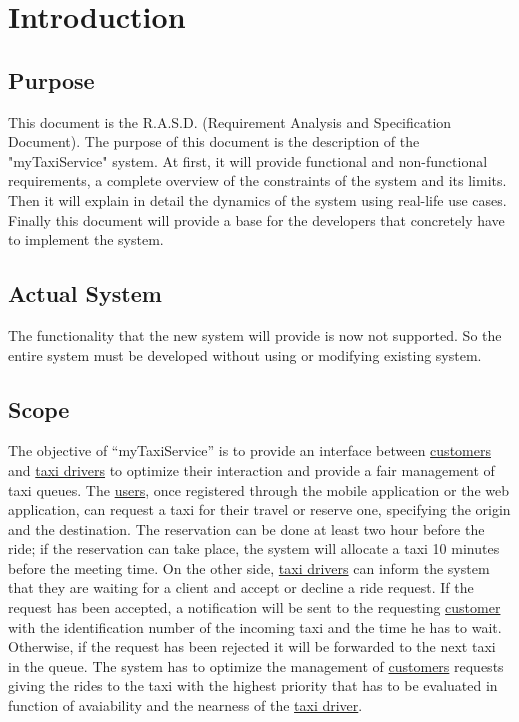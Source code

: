 \newpage
\chapter{Introduction}

	\section{Purpose}
	This document is the R.A.S.D. (Requirement Analysis and Specification Document).
	The purpose of this document is the description of the "myTaxiService" system. 
	At first, it will provide functional and non-functional requirements, a complete overview of the constraints of the system and its limits. Then it will explain in detail the dynamics of the system using real-life use cases.
	Finally this document will provide a base for the developers that concretely have to implement the system.

	\section{Actual System}
	The functionality that the new system will provide is now not supported. 
	So the entire system must be developed without using or modifying existing system.

	\section{Scope}
	The objective of “myTaxiService” is to provide an interface between \hyperref[sec:customer]{customers} and \hyperref[sec:tdriver]{taxi drivers} to optimize their interaction and provide a fair management of taxi queues. The \hyperref[sec:normaluser]{users}, once registered through the mobile application or the web application, can request a taxi for their travel or reserve one, specifying the origin and the destination. The reservation can be done at least two hour before the ride; if the reservation can take place, the system will allocate a taxi 10 minutes before the meeting time.
	On the other side, \hyperref[sec:tdriver]{taxi drivers} can inform the system that they are waiting for a client and accept or decline a ride request. If the request has been accepted, a notification will be sent to the requesting \hyperref[sec:customer]{customer} with the identification number of the incoming taxi and the time he has to wait. Otherwise, if the request has been rejected it will be forwarded to the next taxi in the queue.
	The system has to optimize the management of \hyperref[sec:customer]{customers} requests giving the rides to the taxi with the highest priority that has to be evaluated in function of avaiability and the nearness of the \hyperref[sec:tdriver]{taxi driver}.

